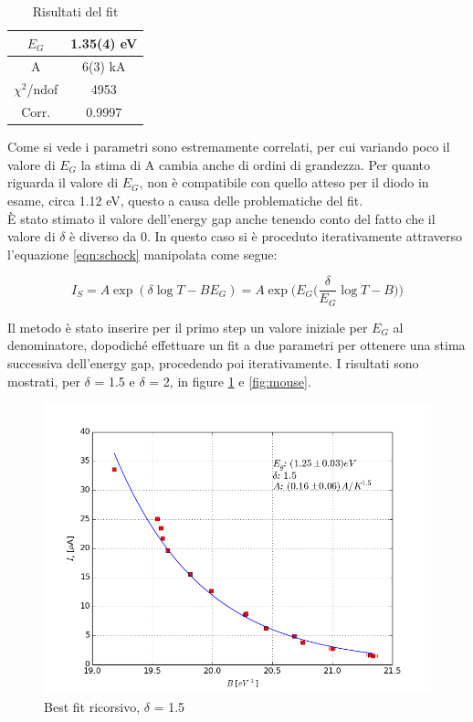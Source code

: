 \documentclass[a4paper]{article}
\begin{document}
\begin{itemize}
\begin{table}[!h]
\centering
\caption{Risultati del fit}
\label{tab:fit}
\begin{tabular}{|c|c|} 
\hline 
$E_G$ & 1.35(4) eV \\ 
\hline 
A & 6(3) kA \\ 
\hline 
$\chi ^2$/ndof & 4953 \\ 
\hline 
Corr. & 0.9997 \\ 
\hline 
\end{tabular} 
\end{table}

Come si vede i parametri sono estremamente correlati, per cui variando poco il valore di $E_G$ la stima di A cambia anche di ordini di grandezza. Per quanto riguarda il valore di $E_G$, non è compatibile con quello atteso per il diodo in esame, circa 1.12 eV, questo a causa delle problematiche del fit.\\
È stato stimato il valore dell'energy gap anche tenendo conto del fatto che il valore di $\delta$ è diverso da 0. In questo caso si è proceduto iterativamente attraverso l'equazione \ref{eqn:schock} manipolata come segue:

\begin{equation}
I_S = A \exp (\delta \log T - BE_G) = A \exp \Bigg (E_G \bigg (\frac{\delta}{E_G} \log T - B \bigg ) \Bigg )
\end{equation}

Il metodo è stato inserire per il primo step un valore iniziale per $E_G$ al denominatore, dopodiché effettuare un fit a due parametri per ottenere una stima successiva dell'energy gap, procedendo poi iterativamente. I risultati sono mostrati, per $\delta$ = 1.5 e $\delta$ = 2, in figure \ref{fig:tiger} e  \ref{fig:mouse}.

\begin{figure}[!h]
\centering
\includegraphics[scale=.5]{energygap_first_recursive1-5}
\caption{Best fit ricorsivo, $\delta$ = 1.5}
\label{fig:tiger}
\end{figure}
   

\end{itemize}
\end{document}

